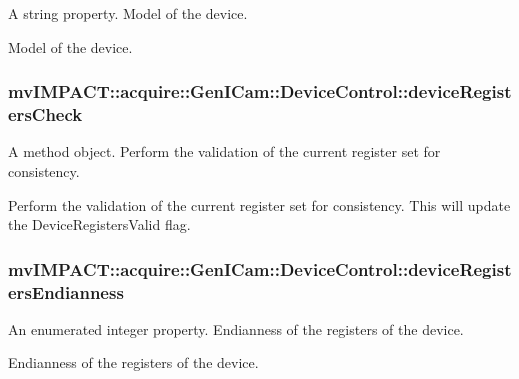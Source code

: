 A string property. Model of the device. 

Model of the device. \hypertarget{classmv_i_m_p_a_c_t_1_1acquire_1_1_gen_i_cam_1_1_device_control_ad9ff87f7a218936a72c833cdc6f5475d}{
\subsubsection[{device\+Registers\+Check}]{ mv\+I\+M\+P\+A\+C\+T\+::acquire\+::\+Gen\+I\+Cam\+::\+Device\+Control\+::device\+Registers\+Check}}\label{classmv_i_m_p_a_c_t_1_1acquire_1_1_gen_i_cam_1_1_device_control_ad9ff87f7a218936a72c833cdc6f5475d}


A method object. Perform the validation of the current register set for consistency. 

Perform the validation of the current register set for consistency. This will update the Device\+Registers\+Valid flag. \hypertarget{classmv_i_m_p_a_c_t_1_1acquire_1_1_gen_i_cam_1_1_device_control_adfdc5166018186879414681ad6a7e7d7}{
\subsubsection[{device\+Registers\+Endianness}]{ mv\+I\+M\+P\+A\+C\+T\+::acquire\+::\+Gen\+I\+Cam\+::\+Device\+Control\+::device\+Registers\+Endianness}}\label{classmv_i_m_p_a_c_t_1_1acquire_1_1_gen_i_cam_1_1_device_control_adfdc5166018186879414681ad6a7e7d7}


An enumerated integer property. Endianness of the registers of the device. 

Endianness of the registers of the device.

